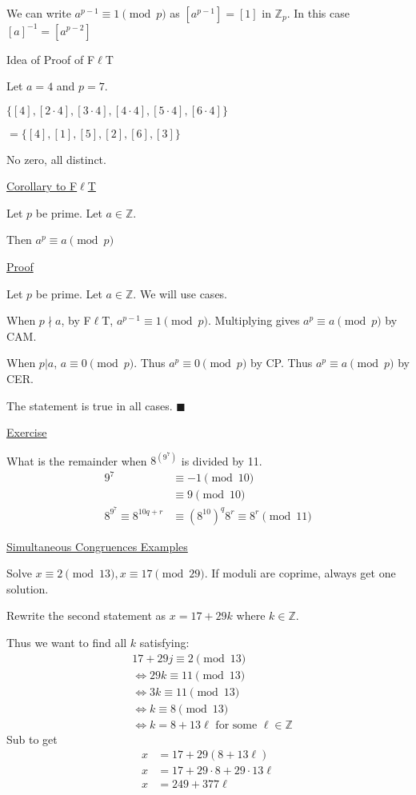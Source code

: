 \documentclass{article}
\begin{document}
We can write $a^{p-1} \equiv 1 \pmod{p}$ as $[a^{p-1}] = [1]$ in $\mathbb{Z}_p$. In this case $[a]^{-1} = [a^{p-2}]$

Idea of Proof of F$\ell$T

Let $a = 4$ and $p = 7$.

$\{[4],[2 \cdot 4], [3 \cdot 4], [4 \cdot 4], [5 \cdot 4], [6 \cdot 4]\}$

$= \{[4],[1],[5],[2],[6],[3]\}$

No zero, all distinct. 

\underline{Corollary to F$\ell$T}

Let $p$ be prime. Let $a \in \mathbb{Z}$. 

Then $a^p \equiv a \pmod{p}$

\underline{Proof}

Let $p$ be prime. Let $a \in \mathbb{Z}$. We will use cases. 

When $p \nmid a$, by F$\ell$T, $a^{p-1} \equiv 1 \pmod{p}$. Multiplying gives $a^p \equiv a \pmod{p}$ by CAM. 

When $p \vert a$, $a \equiv 0 \pmod{p}$. Thus $a^p \equiv 0 \pmod{p}$ by CP. Thus $a^p \equiv a \pmod{p}$ by CER. 

The statement is true in all cases. $\blacksquare$

\underline{Exercise}

What is the remainder when $8^{(9^7)}$ is divided by 11. 
\begin{align*}
    9^7 &\equiv -1 \pmod{10}\\
    &\equiv 9 \pmod{10}\\
    8^{9^{7}} \equiv 8^{10q + r} &\equiv (8^{10})^q8^r \equiv 8^r \pmod{11}
\end{align*}

\underline{Simultaneous Congruences Examples}

Solve $x \equiv 2 \pmod{13}, x \equiv 17 \pmod{29}$. If moduli are coprime, always get one solution.

Rewrite the second statement as $x = 17 + 29k$ where $k \in \mathbb{Z}$. 

Thus we want to find all $k$ satisfying:
\begin{align*}
    &17+29j \equiv 2 \pmod{13}\\
    &\iff 29k \equiv 11 \pmod{13} \\
    &\iff 3k \equiv 11 \pmod{13} \\
    &\iff k \equiv 8 \pmod{13} \\
    &\iff k = 8 + 13\ell \text{ for some } \ell \in \mathbb{Z} 
\end{align*}
Sub to get 
\begin{align*}
    x &= 17 + 29(8 + 13\ell) \\
    x &= 17 + 29 \cdot 8 + 29 \cdot 13\ell \\
    x &= 249 + 377\ell
\end{align*}
\end{document}
